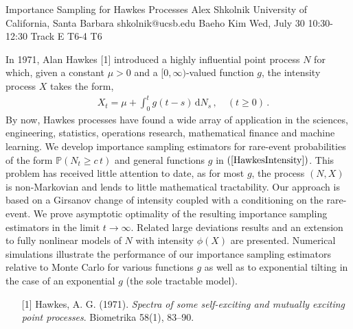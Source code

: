 \begin{talk}
  {Importance Sampling for Hawkes Processes}%
  {Alex Shkolnik}%
  {University of California, Santa Barbara}%
  {shkolnik@ucsb.edu}%
  {Baeho Kim}%
  {}%
  {Wed, July 30 10:30-12:30 Track E}%
  {T6-4}%
  {T6}%
			
In 1971, Alan Hawkes [1] introduced a highly influential point
process $N$ for which, given a constant $\mu > 0$ and a
$[0,\infty)$-valued function $g$, the intensity process $X$
takes the form,
\begin{align} \label{HawkesIntensity} 
 \quad X_t = \mu + \int_0^t g(t-s) \, \mathrm{d} N_s \, ,
 \quad (t \ge 0) \, .
\end{align}
By now, Hawkes processes have found a wide array of application
in the sciences, engineering, statistics, operations research,
mathematical finance and machine learning. We develop importance
sampling estimators for rare-event probabilities of the form
$\mathbb{P}(N_t \ge c \, t)$ and general functions $g$ in
$(\ref{HawkesIntensity})$. This problem has received little 
attention to
date, as for most $g$, the process $(N,X)$ is
non-Markovian and lends to little mathematical tractability.
Our approach is based on a Girsanov change of intensity coupled
with a conditioning on the rare-event.  We prove asymptotic
optimality of the resulting importance sampling estimators in
the limit $t \to \infty$. Related large deviations results and
an extension to fully nonlinear models of $N$ with intensity
$\phi(X)$ are presented.  Numerical simulations illustrate the
performance of our importance sampling estimators relative to
Monte Carlo for various functions $g$ as well as to exponential
tilting in the case of an exponential $g$ (the sole tractable
model).


\medskip


\begin{enumerate}
	\item[{[1]}] Hawkes, A. G. (1971). {\it Spectra of some 
self-exciting and mutually exciting point processes}. 
Biometrika 58(1), 83–90.
\end{enumerate}


\end{talk}
